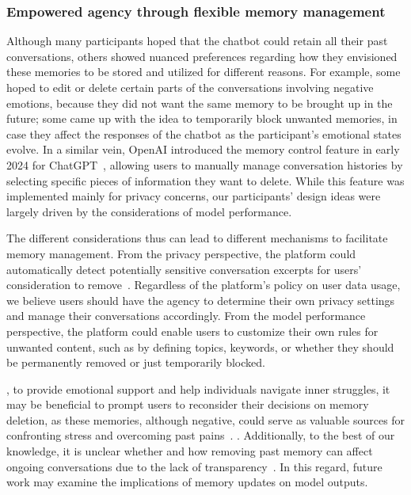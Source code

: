\subsubsection{Empowered agency through flexible memory management}
Although many participants hoped that the chatbot could retain all their past conversations, others showed nuanced preferences regarding how they envisioned these memories to be stored and utilized for different reasons. For example, some hoped to edit or delete certain parts of the conversations involving negative emotions, because they did not want the same memory to be brought up in the future; some came up with the idea to temporarily block unwanted memories, in case they affect the responses of the chatbot as the participant's emotional states evolve. 
In a similar vein, OpenAI introduced the memory control feature in early 2024 for ChatGPT~\cite{openaimemory2024}, allowing users to manually manage conversation histories by selecting specific pieces of information they want to delete. While this feature was implemented mainly for privacy concerns, our participants' design ideas were largely driven by the considerations of model performance.

The different considerations thus can lead to different mechanisms to facilitate memory management. From the privacy perspective, the platform could automatically detect potentially sensitive conversation excerpts for users' consideration to remove~\cite{mireshghallah2024trust}. Regardless of the platform's policy on user data usage, we believe users should have the agency to determine their own privacy settings and manage their conversations accordingly.
From the model performance perspective, the platform could enable users to customize their own rules for unwanted content, such as by defining topics, keywords, or whether they should be permanently removed or just temporarily blocked. 

, to provide emotional support and help individuals navigate inner struggles, it may be beneficial to prompt users to reconsider their decisions on memory deletion, as these memories, although negative, could serve as valuable sources for confronting stress and overcoming past pains~\cite{coduto2024delete}. .
Additionally, to the best of our knowledge, it is unclear whether and how removing past memory can affect ongoing conversations due to the lack of transparency~\cite{kim2024breakthrough}. In this regard, future work may examine the implications of memory updates on model outputs.


